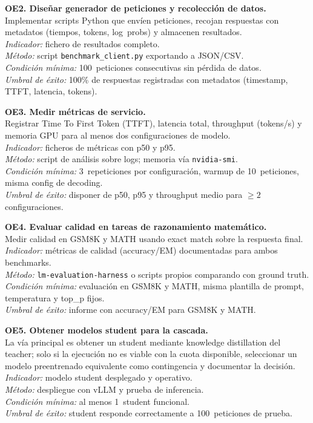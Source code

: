\documentclass[11pt,a4paper]{article}
\begin{document}
\textbf{OE2. Diseñar generador de peticiones y recolección de datos.}\\
Implementar scripts Python que envíen peticiones, recojan respuestas con metadatos (tiempos, tokens, log~probs) y almacenen resultados.\\
\textit{Indicador:} fichero de resultados completo.\\
\textit{Método:} script \texttt{benchmark\_client.py} exportando a JSON/CSV.\\
\textit{Condición mínima:} 100~peticiones consecutivas sin pérdida de datos.\\
\textit{Umbral de éxito:} 100\% de respuestas registradas con metadatos (timestamp, TTFT, latencia, tokens).

\textbf{OE3. Medir métricas de servicio.}\\
Registrar Time To First Token (TTFT), latencia total, throughput (tokens/s) y memoria GPU para al menos dos configuraciones de modelo.\\
\textit{Indicador:} ficheros de métricas con p50 y p95.\\
\textit{Método:} script de análisis sobre logs; memoria vía \texttt{nvidia-smi}.\\
\textit{Condición mínima:} 3~repeticiones por configuración, warmup de 10~peticiones, misma config de decoding.\\
\textit{Umbral de éxito:} disponer de p50, p95 y throughput medio para $\geq2$ configuraciones.

\textbf{OE4. Evaluar calidad en tareas de razonamiento matemático.}\\
Medir calidad en GSM8K y MATH usando exact match sobre la respuesta final.\\
\textit{Indicador:} métricas de calidad (accuracy/EM) documentadas para ambos benchmarks.\\
\textit{Método:} \texttt{lm-evaluation-harness} o scripts propios comparando con ground truth.\\
\textit{Condición mínima:} evaluación en GSM8K y MATH, misma plantilla de prompt, temperatura y top\_p fijos.\\
\textit{Umbral de éxito:} informe con accuracy/EM para GSM8K y MATH.

\textbf{OE5. Obtener modelos student para la cascada.}\\
La vía principal es obtener un student mediante knowledge distillation del teacher; solo si la ejecución no es viable con la cuota disponible, seleccionar un modelo preentrenado equivalente como contingencia y documentar la decisión.\\
\textit{Indicador:} modelo student desplegado y operativo.\\
\textit{Método:} despliegue con vLLM y prueba de inferencia.\\
\textit{Condición mínima:} al menos 1~student funcional.\\
\textit{Umbral de éxito:} student responde correctamente a 100~peticiones de prueba.
\end{document}

